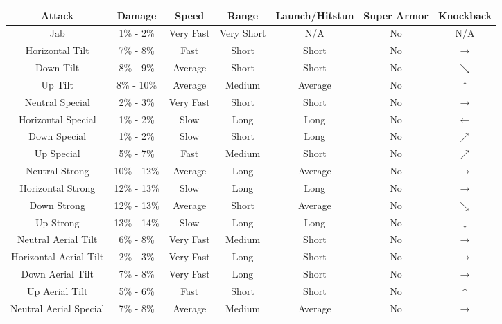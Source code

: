 \begin{table}[h!]
    \centering
    \begin{tabular}{| c | c | c | c | c | c | c |}
        \hline
        \textbf{Attack} & \textbf{Damage} & \textbf{Speed} & \textbf{Range} & \textbf{Launch/Hitstun} & \textbf{Super Armor} & \textbf{Knockback} \\
        \hline
        Jab & 1\% - 2\% & Very Fast & Very Short & N/A & No & N/A \\
        \hline
        Horizontal Tilt & 7\% - 8\% & Fast & Short & Short & No & $\rightarrow$ \\
        \hline
        Down Tilt & 8\% - 9\% & Average & Short & Short & No & $\searrow$ \\
        \hline
        Up Tilt & 8\% - 10\% & Average & Medium & Average & No & $\uparrow$ \\
        \hline
        Neutral Special & 2\% - 3\% & Very Fast & Short & Short & No & $\rightarrow$ \\
        \hline
        Horizontal Special & 1\% - 2\% & Slow & Long & Long & No & $\leftarrow$ \\
        \hline
        Down Special & 1\% - 2\% & Slow & Short & Long & No & $\nearrow$ \\
        \hline
        Up Special & 5\% - 7\% & Fast & Medium & Short & No & $\nearrow$ \\
        \hline
        Neutral Strong & 10\% - 12\% & Average & Long & Average & No & $\rightarrow$ \\
        \hline
        Horizontal Strong & 12\% - 13\% & Slow & Long & Long & No & $\rightarrow$ \\
        \hline
        Down Strong & 12\% - 13\% & Average & Short & Average & No & $\searrow$ \\
        \hline
        Up Strong & 13\% - 14\% & Slow & Long & Long & No & $\downarrow$ \\
        \hline
        Neutral Aerial Tilt & 6\% - 8\% & Very Fast & Medium & Short & No & $\rightarrow$ \\
        \hline
        Horizontal Aerial Tilt & 2\% - 3\% & Very Fast & Long & Short & No & $\rightarrow$ \\
        \hline
        Down Aerial Tilt & 7\% - 8\% & Very Fast & Long & Short & No & $\rightarrow$ \\
        \hline
        Up Aerial Tilt & 5\% - 6\% & Fast & Short & Short & No & $\uparrow$ \\
        \hline
        Neutral Aerial Special & 7\% - 8\% & Average & Medium & Average & No & $\rightarrow$ \\

\end{tabular}
\end{table}
